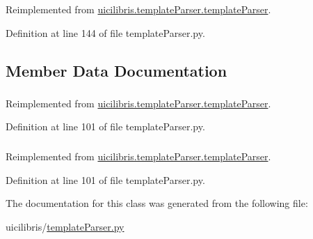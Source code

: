 \-Reimplemented from \hyperlink{classuicilibris_1_1templateParser_1_1templateParser_a48f677f123127c39f6c84eb3737e2ded}{uicilibris.\-template\-Parser.\-template\-Parser}.



\-Definition at line 144 of file template\-Parser.\-py.



\subsection{\-Member \-Data \-Documentation}
\hypertarget{classuicilibris_1_1templateParser_1_1imageParser_acbade4bd60a213ae591dad90f64021a7}{
\subsubsection[{pattern}]{}}\label{classuicilibris_1_1templateParser_1_1imageParser_acbade4bd60a213ae591dad90f64021a7}


\-Reimplemented from \hyperlink{classuicilibris_1_1templateParser_1_1templateParser_a11df7ff35853b6cc9015f5c5451aa921}{uicilibris.\-template\-Parser.\-template\-Parser}.



\-Definition at line 101 of file template\-Parser.\-py.

\hypertarget{classuicilibris_1_1templateParser_1_1imageParser_aaf8ed396434c4dc4b6edc3dcf1ffbbd2}{
\subsubsection[{regexp}]{}}\label{classuicilibris_1_1templateParser_1_1imageParser_aaf8ed396434c4dc4b6edc3dcf1ffbbd2}


\-Reimplemented from \hyperlink{classuicilibris_1_1templateParser_1_1templateParser_ac3d4f484ad1e51f0191b43c21f4a6873}{uicilibris.\-template\-Parser.\-template\-Parser}.



\-Definition at line 101 of file template\-Parser.\-py.



\-The documentation for this class was generated from the following file\-:\begin{DoxyCompactItemize}
\item 
uicilibris/\hyperlink{templateParser_8py}{template\-Parser.\-py}\end{DoxyCompactItemize}
